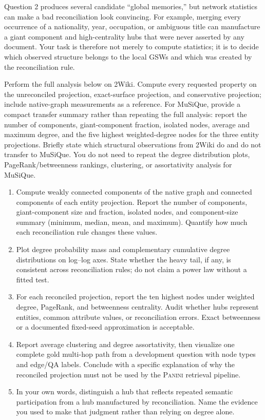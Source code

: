 \documentclass[11pt]{article}
\newcommand{\PANINI}{{\mdseries\textsc{Panini}}\xspace}
\begin{document}
Question 2 produces several candidate ``global memories,'' but network
statistics can make a bad reconciliation look convincing. For example,
merging every occurrence of a nationality, year, occupation, or ambiguous
title can manufacture a giant component and high-centrality hubs that were
never asserted by any document. Your task is therefore not merely to compute
statistics; it is to decide which observed structure belongs to the local GSWs
and which was created by the reconciliation rule.

Perform the full analysis below on 2Wiki. Compute every requested property on
the unreconciled projection, exact-surface projection, and conservative
projection; include native-graph measurements as a reference. For MuSiQue,
provide a compact transfer summary rather than repeating the full analysis:
report the number of components, giant-component fraction, isolated nodes,
average and maximum degree, and the five highest weighted-degree nodes for the
three entity projections. Briefly state which structural observations from
2Wiki do and do not transfer to MuSiQue. You do not need to repeat the degree
distribution plots, PageRank/betweenness rankings, clustering, or assortativity
analysis for MuSiQue.

\begin{enumerate}[label=(\alph*)]
  \item Compute weakly connected components of the native graph and connected
        components of each entity projection. Report the number of components,
        giant-component size and fraction, isolated nodes, and component-size
        summary (minimum, median, mean, and maximum). Quantify how much each
        reconciliation rule changes these values.
  \item Plot degree probability mass and complementary cumulative degree
        distributions on log--log axes. State whether the heavy tail, if any,
        is consistent across reconciliation rules; do not claim a power law
        without a fitted test.
  \item For each reconciled projection, report the ten highest nodes under
        weighted degree, PageRank, and betweenness centrality. Audit whether
        hubs represent entities, common attribute values, or reconciliation
        errors. Exact betweenness or a documented fixed-seed approximation is
        acceptable.
  \item Report average clustering and degree assortativity, then visualize one
        complete gold multi-hop path from a development question with node
        types and edge/QA labels. Conclude with a specific explanation of why
        the reconciled projection must not be used by the \PANINI retrieval
        pipeline.
  \item In your own words, distinguish a hub that reflects repeated semantic
        participation from a hub manufactured by reconciliation. Name the
        evidence you used to make that judgment rather than relying on degree
        alone.
\end{enumerate}
\end{document}
